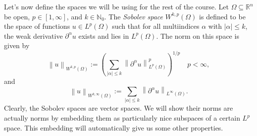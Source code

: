\documentclass{book}
\newcommand{\bbN}{\mathbb{N}}
\newcommand{\bbR}{\mathbb{R}}
\newcommand{\abs}[1]{\left\lvert {#1} \right\rvert}
\newcommand{\norm}[1]{\left\lVert {#1} \right\rVert}
\newcommand{\parens}[1]{\left( {#1} \right)}
\theoremstyle{definition}
\numberwithin{equation}{chapter}
\begin{document}
Let's now define the spaces we will be using for the rest of the course. Let $\Omega \subseteq \bbR^n$ be open, $p \in [1,\infty]$, and $k \in \bbN_0$. The \textit{Sobolev space} $W^{k,p}(\Omega)$ is defined to be the space of functions $u \in L^p(\Omega)$ such that for all multiindices $\alpha$ with $\abs{\alpha} \leq k$, the weak derivative $\partial^\alpha u$ exists and lies in $L^p(\Omega)$. The norm on this space is given by
\begin{equation}
    \norm{u}_{W^{k,p}(\Omega)} := \parens{ \sum_{\abs{\alpha} \leq k} \norm{\partial^\alpha u}_{L^p(\Omega)}^p }^{1/p} \quad p < \infty,
\end{equation}
and
\begin{equation}
    \norm{u}_{W^{k,\infty}(\Omega)} := \sum_{\abs{\alpha} \leq k} \norm{\partial^\alpha u}_{L^\infty(\Omega)}.
\end{equation}
Clearly, the Sobolev spaces are vector spaces. We will show their norms are actually norms by embedding them as particularly nice subspaces of a certain $L^p$ space. This embedding will automatically give us some other properties.
\end{document}
